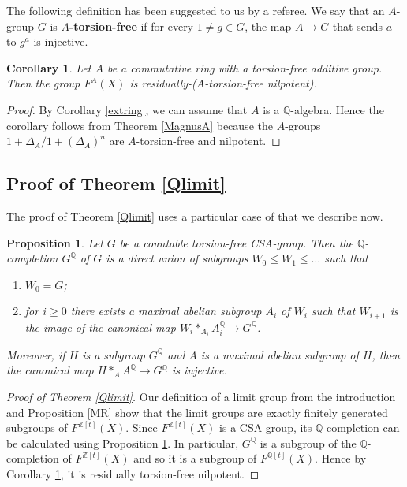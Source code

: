 \documentclass[11pt]{amsart}
\newtheorem{pro}[lem]{Proposition}
\newtheorem{cor}[lem]{Corollary}
\numberwithin{claimcounter}{lem}
\newcommand{\Z}{\mathbb{Z}}
\newcommand{\Q}{\mathbb{Q}}
\begin{document}
  The following definition has been suggested to us by a referee. We say that an $A$-group $G$  is {\bf $A$-torsion-free} if for every $1\ne g\in G$, the map $A\to G$ that sends $a$ to $g^a$ is injective.
 \begin{cor}\label{qttf} \label{residuallynilpotent2} Let $A$ be a   commutative ring  with a torsion-free additive group.
 Then the group $F^{A}(X)$ is residually-($A$-torsion-free nilpotent).
 \end{cor}
 \begin{proof}
 By Corollary \ref{extring},  we can assume that $A$ is a  $\Q$-algebra. Hence the corollary  follows from Theorem \ref{MagnusA} because the $A$-groups $1+\Delta_A/1+(\Delta_A)^n$ are $A$-torsion-free  and nilpotent.
 \end{proof}

  
 \subsection{Proof of Theorem \ref{Qlimit}}
The proof of Theorem \ref{Qlimit}  uses a particular case of \cite[Theorem 8]{MR96} that we describe now.
 \begin{pro}\label{QcompletionCSA}
 Let $G$ be a countable torsion-free CSA-group. Then the $\Q$-completion $G^\Q$ of $G$ is a direct union of subgroups $W_0\le W_1\le \ldots $ such that
 \begin{enumerate}
 \item 
  [(a)]$W_0=G$;
  \item [(b)]   for $i\ge 0$  there exists a  maximal abelian subgroup $A_i$ of $ W_i$   such that  $W_{i+1}$ is the image of  the canonical map $W_{i}*_{A_i}A_i^{\Q} \to G^\Q$.
 \end{enumerate}
 Moreover, if $H$ is a subgroup $G^{\Q}$ and $A$ is a maximal abelian subgroup of $H$, then  the canonical map $H*_{A}A^{\Q}\to G{^\Q}$ is injective.
 \end{pro}
 
 \begin{proof}[Proof of  Theorem \ref{Qlimit}] Our definition of a limit group from the introduction and
  Proposition \ref{MR} show that  the limit groups are exactly finitely generated subgroups of $F^{\Z[t]}(X)$. Since  $F^{\Z[t]}(X)$  is a CSA-group,
 its $\Q$-completion  can be calculated using  Proposition \ref{QcompletionCSA}. In particular,  $G^\Q$ is a subgroup of the $\Q$-completion of  $F^{\Z[t]}(X)$ and so it is a subgroup of $F^{\Q[t]}(X)$. Hence by Corollary \ref{qttf}, it is  residually torsion-free nilpotent.
\end{proof}
 
\end{document}
